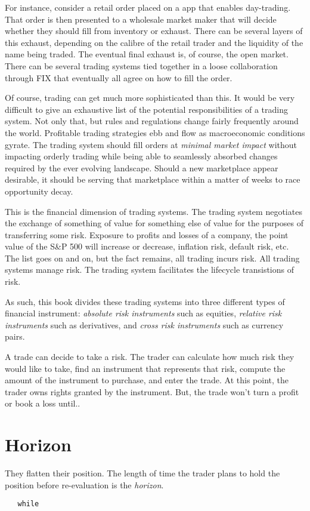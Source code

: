 For instance, consider a retail order placed on a app that enables day-trading.
That order is then presented to a wholesale market maker that will decide whether they
should fill from inventory or exhaust.  There can be several layers of this exhaust,
depending on the calibre of the retail trader and the liquidity of the name being
traded. The eventual final exhaust is, of course, the open market.  There can be
several trading systems tied together in a loose collaboration through FIX that
eventually all agree on how to fill the order.

Of course, trading can get much more sophisticated than this.  It would be very
difficult to give an exhaustive list of the potential responsibilities of a trading
system.  Not only that, but rules and regulations change fairly frequently around
the world.  Profitable trading strategies ebb and flow as macroeconomic conditions
gyrate. The trading system should fill orders at \emph{minimal market impact} without
impacting orderly trading while being able to seamlessly absorbed changes required
by the ever evolving landscape. Should a new marketplace appear desirable, it should be 
serving that marketplace within a matter of weeks to race opportunity decay.

This is the financial dimension of trading systems.  The trading system negotiates the
exchange of something of value for something else of value for the purposes of 
transferring some risk.  Exposure to profits and losses of a company, the point 
value of the S\&P 500 will increase or decrease, inflation risk, default risk,
etc.  The list 
goes on and on, but the fact remains, all trading incurs risk.  All trading systems 
manage risk.  The trading system facilitates the lifecycle transistions of risk.

As such, this book divides these trading systems into three different types of 
financial instrument: \emph{absolute risk instruments} such as equities, 
\emph{relative risk instruments} such as derivatives, and \emph{cross risk 
instruments} such as currency pairs.  

A trade can decide to take a risk.  The trader can calculate how much risk they would
like to take, find an instrument that represents that risk, compute the amount of the
instrument to purchase, and enter the trade. At this point, the trader owns rights
granted by the instrument.  But, the trade won't turn a profit or book a loss until..

\section{Horizon}

They flatten their position.  The length of time the trader plans to hold the position
before re-evaluation is the \emph{horizon}.  






\begin{lstlisting}
   while 
\end{lstlisting}

